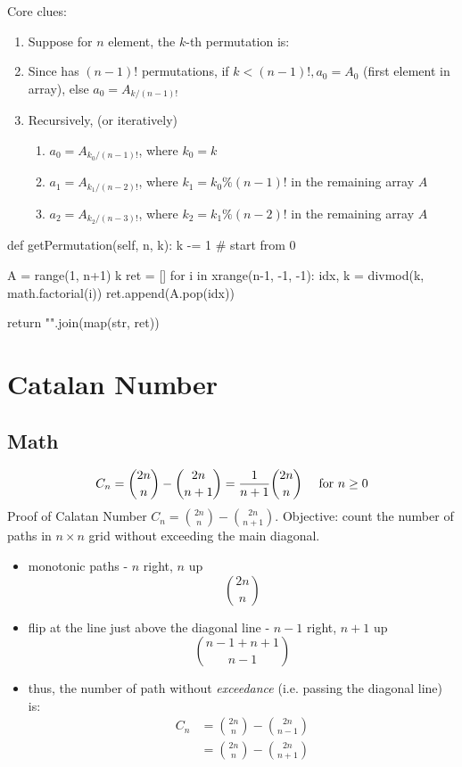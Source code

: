 Core clues:
\begin{enumerate}
\item {}

Suppose for $n$ element, the $k$-th permutation is:

\item {} Since \pyinline{[a1, a3, ..., an-1]} has $(n-1)!$ permutations,
if $k < (n-1)!, a_0 = A_0$ (first element in array), else $a_0 = A_{k/(n-1)!}$

\item Recursively, (or iteratively)
\begin{enumerate}
\item $a_0 = A_{k_0/(n-1)!}$, where $k_0 = k$
\item $a_1 = A_{k_1/(n-2)!}$, where $k_1 = k_0\%(n-1)!$ in the remaining array $A$
\item $a_2 = A_{k_2/(n-3)!}$, where $k_2 = k_1\%(n-2)!$ in the remaining array $A$
\end{enumerate}
\end{enumerate}
\begin{python}
def getPermutation(self, n, k):
    k -= 1  # start from 0

    A = range(1, n+1)
    k %
    ret = []
    for i in xrange(n-1, -1, -1):
        idx, k = divmod(k, math.factorial(i))
        ret.append(A.pop(idx))

    return "".join(map(str, ret))
\end{python}

\section{Catalan Number}
\subsection{Math}
$$
C_n = {2n\choose n} - {2n\choose n+1} = {1\over n+1}{2n\choose n} \quad\text{ for }n\ge 0
$$
 Proof of Calatan Number $C_n ={2n\choose n} - {2n\choose n+1}$. Objective: count the number of paths in $n\times n$ grid without exceeding the main diagonal. 
\begin{itemize}
\begin{figure}[]
    \centerline{\texttt{[image: catalan\_proof]}}
    \caption{Monotonic Paths}
  \label{fig:catalanProof}
\end{figure}
\item monotonic paths - $n$ right, $n$ up
$$
{2n\choose n}
$$
\item flip at the line just above the diagonal line - $n-1$ right, $n+1$ up
$$
{n-1+n+1\choose n-1}
$$
\item thus, the number of path without \textit{exceedance} (i.e. passing the diagonal line) is: 
\begin{align*}
C_n &= {2n\choose n} - {2n\choose n-1}\\ 
&={2n\choose n} - {2n\choose n+1}
\end{align*}
\end{itemize}

